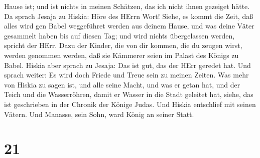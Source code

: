 Hause ist; und ist nichts in meinen Schätzen, das ich nicht ihnen
gezeiget hätte.  Da sprach Jesaja zu Hiskia: Höre des HErrn
Wort!  Siehe, es kommt die Zeit, daß alles wird gen Babel
weggeführet werden aus deinem Hause, und was deine Väter gesammelt haben
bis auf diesen Tag; und wird nichts übergelassen werden, spricht der
HErr.  Dazu der Kinder, die von dir kommen, die du zeugen
wirst, werden genommen werden, daß sie Kämmerer seien im Palast des
Königs zu Babel.  Hiskia aber sprach zu Jesaja: Das ist
gut, das der HErr geredet hat. Und sprach weiter: Es wird doch Friede
und Treue sein zu meinen Zeiten.  Was mehr von Hiskia zu
sagen ist, und alle seine Macht, und was er getan hat, und der Teich und
die Wasserröhren, damit er Wasser in die Stadt geleitet hat, siehe, das
ist geschrieben in der Chronik der Könige Judas.  Und
Hiskia entschlief mit seinen Vätern. Und Manasse, sein Sohn, ward König
an seiner Statt.

\hypertarget{section-20}{%
\section{21}\label{section-20}}

